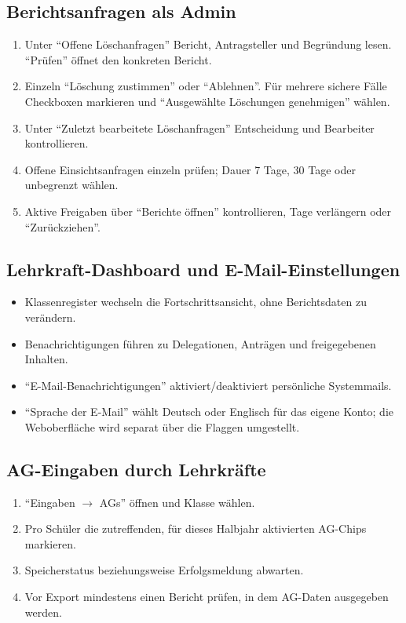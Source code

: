\documentclass[12pt,a4paper]{article}
\begin{document}
\subsection{Berichtsanfragen als Admin}
\begin{enumerate}
  \item Unter \enquote{Offene Löschanfragen} Bericht, Antragsteller und Begründung lesen. \enquote{Prüfen} öffnet den konkreten Bericht.
  \item Einzeln \enquote{Löschung zustimmen} oder \enquote{Ablehnen}. Für mehrere sichere Fälle Checkboxen markieren und \enquote{Ausgewählte Löschungen genehmigen} wählen.
  \item Unter \enquote{Zuletzt bearbeitete Löschanfragen} Entscheidung und Bearbeiter kontrollieren.
  \item Offene Einsichtsanfragen einzeln prüfen; Dauer 7 Tage, 30 Tage oder unbegrenzt wählen.
  \item Aktive Freigaben über \enquote{Berichte öffnen} kontrollieren, Tage verlängern oder \enquote{Zurückziehen}.
\end{enumerate}

\subsection{Lehrkraft-Dashboard und E-Mail-Einstellungen}
\begin{itemize}
  \item Klassenregister wechseln die Fortschrittsansicht, ohne Berichtsdaten zu verändern.
  \item Benachrichtigungen führen zu Delegationen, Anträgen und freigegebenen Inhalten.
  \item \enquote{E-Mail-Benachrichtigungen} aktiviert/deaktiviert persönliche Systemmails.
  \item \enquote{Sprache der E-Mail} wählt Deutsch oder Englisch für das eigene Konto; die Weboberfläche wird separat über die Flaggen umgestellt.
\end{itemize}

\subsection{AG-Eingaben durch Lehrkräfte}
\begin{enumerate}
  \item \enquote{Eingaben \(\rightarrow\) AGs} öffnen und Klasse wählen.
  \item Pro Schüler die zutreffenden, für dieses Halbjahr aktivierten AG-Chips markieren.
  \item Speicherstatus beziehungsweise Erfolgsmeldung abwarten.
  \item Vor Export mindestens einen Bericht prüfen, in dem AG-Daten ausgegeben werden.
\end{enumerate}
\end{document}
